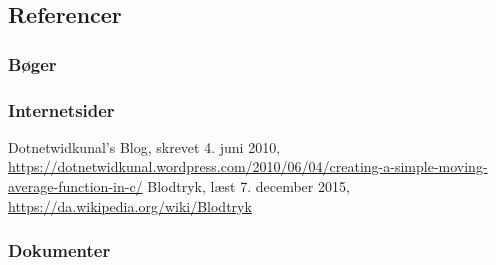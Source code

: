 \begin{thebibliography}{99}
\section{Referencer}
\subsubsection{Bøger}
\subsubsection{Internetsider}
Dotnetwidkunal's Blog, skrevet 4. juni 2010,
\url{https://dotnetwidkunal.wordpress.com/2010/06/04/creating-a-simple-moving-average-function-in-c/}
Blodtryk, læst 7. december 2015, \url{https://da.wikipedia.org/wiki/Blodtryk}

\subsubsection{Dokumenter}

\end{thebibliography}
